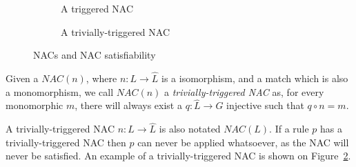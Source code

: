 \begin{example}
\begin{figure}[!ht]
\begin{subfigure}[t]{.5\textwidth}
    \caption{A triggered NAC}\label{fig:gts:nacs:triggered}
  \end{subfigure}
  \begin{subfigure}[t]{.5\textwidth}
    \centerline{}
    \caption{A trivially-triggered NAC}\label{fig:gts:nacs:trivial}
  \end{subfigure}
  \caption{NACs and NAC satisfiability}\label{fig:gts:nacs}
\end{figure}
\end{example}


\begin{definition} Given a $NAC(n)$, where $n : L \rightarrow \hat{L}$ is a isomorphism, and a match \match{} which is also a monomorphism, we call $NAC(n)$ a \emph{trivially-triggered NAC} as, for every monomorphic $m$, there will always exist a $q : \hat{L} \rightarrow G$ injective such that $q \circ n = m$.

  A trivially-triggered NAC $n : L \rightarrow \hat{L}$ is also notated $NAC(L)$. If a rule $p$ has a trivially-triggered NAC then $p$ can never be applied whatsoever, as the NAC will never be satisfied. An example of a trivially-triggered NAC is shown on Figure~\ref{fig:gts:nacs:trivial}.
\end{definition}

